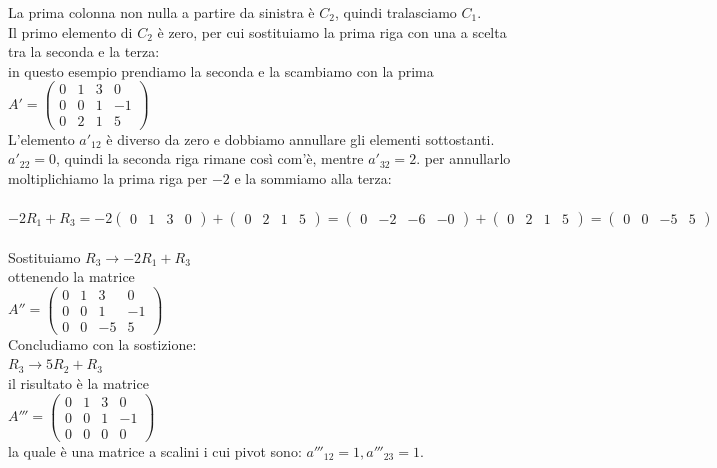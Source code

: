 \documentclass{report}
\begin{document}
{La prima colonna non nulla a partire da sinistra è $C_2$, quindi tralasciamo $C_1$.
\\
Il primo elemento di $C_2$ è zero, per cui sostituiamo la prima riga con una a scelta tra la seconda e la terza: 
\\
in questo esempio prendiamo la seconda e la scambiamo con la prima
\\
$  
A' = \begin{pmatrix}
  0 & 1 & 3 & 0 \\
  0 & 0 & 1 & -1 \\
  0 & 2 & 1 & 5 
\end{pmatrix}
$
\\
L'elemento $a'_{12}$ è diverso da zero e dobbiamo annullare gli elementi sottostanti.
\\
$a'_{22} = 0$, quindi la seconda riga rimane così com'è, mentre $a'_{32} = 2$. per annullarlo moltiplichiamo la prima riga per $-2$ e la sommiamo alla terza:
\\
\\
$-2R_1 + R_3 = -2\begin{pmatrix}0 & 1 & 3 & 0\end{pmatrix} + \begin{pmatrix}0 & 2 & 1 & 5\end{pmatrix} = \begin{pmatrix}0 & -2 & -6 & -0\end{pmatrix} + \begin{pmatrix}0 & 2 & 1 & 5\end{pmatrix} = \begin{pmatrix}0 & 0 & -5 & 5\end{pmatrix}$
\\
\\
Sostituiamo $R_3 \rightarrow -2R_1 + R_3$
\\
ottenendo la matrice
\\
$  
A'' = \begin{pmatrix}
  0 & 1 & 3 & 0 \\
  0 & 0 & 1 & -1 \\
  0 & 0 & -5 & 5 
\end{pmatrix}
$
\\
Concludiamo con la sostizione:
\\
$R_3 \rightarrow 5R_2 + R_3$
\\
il risultato è la matrice
\\
$  
A'''=\begin{pmatrix}
  0 & 1 & 3 & 0 \\
  0 & 0 & 1 & -1 \\
  0 & 0 & 0 & 0 
\end{pmatrix}
$
\\ 
la quale è una matrice a scalini i cui pivot sono: $a'''_{12} = 1, a'''_{23} = 1$.
}
\end{document}
